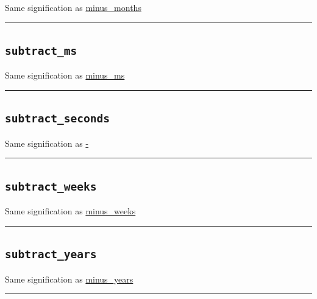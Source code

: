 \documentclass[]{book}
\theoremstyle{definition}
\theoremstyle{definition}
\theoremstyle{definition}
\theoremstyle{remark}
\begin{document}
Same signification as
\href{operators-i-to-m.html\#minus_months}{minus\_months}

\begin{center}\rule{0.5\linewidth}{\linethickness}\end{center}

\subsection{\texorpdfstring{\texttt{subtract\_ms}}{subtract\_ms}}\label{subtract_ms}

Same signification as \href{operators-i-to-m.html\#minus_ms}{minus\_ms}

\begin{center}\rule{0.5\linewidth}{\linethickness}\end{center}

\subsection{\texorpdfstring{\texttt{subtract\_seconds}}{subtract\_seconds}}\label{subtract_seconds}

Same signification as \href{operators-a-to-a.html\#-}{-}

\begin{center}\rule{0.5\linewidth}{\linethickness}\end{center}

\subsection{\texorpdfstring{\texttt{subtract\_weeks}}{subtract\_weeks}}\label{subtract_weeks}

Same signification as
\href{operators-i-to-m.html\#minus_weeks}{minus\_weeks}

\begin{center}\rule{0.5\linewidth}{\linethickness}\end{center}

\subsection{\texorpdfstring{\texttt{subtract\_years}}{subtract\_years}}\label{subtract_years}

Same signification as
\href{operators-i-to-m.html\#minus_years}{minus\_years}

\begin{center}\rule{0.5\linewidth}{\linethickness}\end{center}
\end{document}

